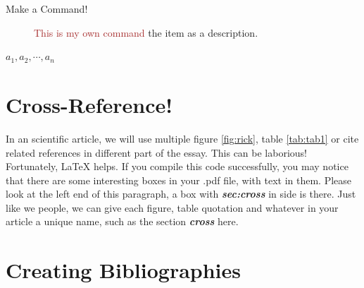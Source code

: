 \documentclass[12pt, letterpaper]{article} %
\begin{document}
\newpage %

\begin{description} %
\item [Make a Command!] \textcolor{brown}{This is my own command} %
the item as a description.
\end{description} %

\newcommand{\myvector}[1]{${#1}_1,{#1}_2,\cdots,{#1}_n$} %
\myvector{a} %



\section{Cross-Reference!} %
\label{sec:cross} %
In an scientific article, we will use multiple figure \ref{fig:rick}, table \ref{tab:tab1} or cite related references 
in different part of the essay. This can be laborious! Fortunately, \LaTeX $ $ helps. If you compile this code 
successfully, you may notice that there are some interesting boxes in your .pdf file, with text in them. Please 
look at the left end of this paragraph, a box with \textsl{\textbf{sec:cross}} in side is there. Just like we people, 
we can give each figure, table quotation and whatever in your article a unique name, such as 
the section \textsl{\textbf{cross}} here. %





\section{Creating Bibliographies} %
\end{document}
